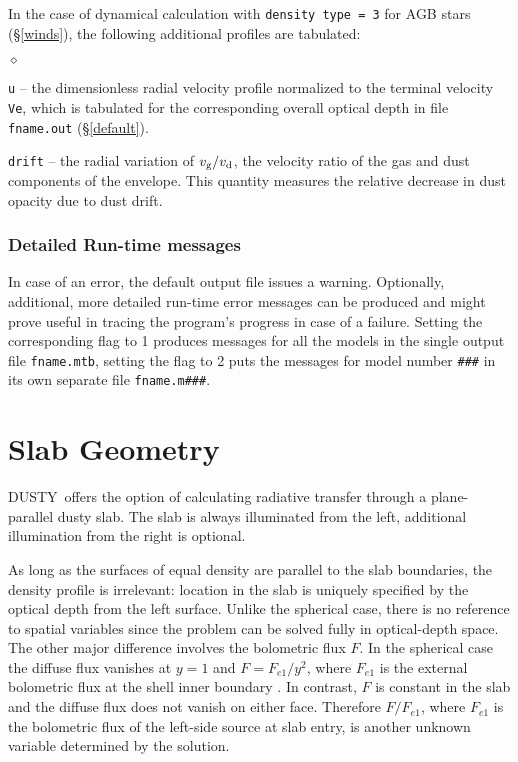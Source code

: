 \documentclass[12pt]{article} \usepackage{epsf}
\def\Section#1{\section{\sc #1}}
\def\D  {{\sf DUSTY}}
\begin{document}
In the case of dynamical calculation with {\tt density type = 3} for AGB stars
(\S\ref{winds}), the following additional profiles are tabulated:

\begin{list}{$\diamond$}{}
\item
{\tt u} -- the dimensionless radial velocity profile normalized to the terminal
velocity {\tt Ve}, which is tabulated for the corresponding overall optical
depth in file {\tt fname.out} (\S \ref{default}).
\item
{\tt drift} -- the radial variation of $v_{\rm g}/v_{\rm d}$, the velocity
ratio of the gas and dust components of the envelope.  This quantity measures
the relative decrease in dust opacity due to dust drift.

\end{list}

\subsubsection{Detailed Run-time messages}
\label{fname.m}

In case of an error, the default output file issues a warning. Optionally,
additional, more detailed run-time error messages can be produced and might
prove useful in tracing the program's progress in case of a failure. Setting
the corresponding flag to 1 produces messages for all the models in the single
output file {\tt fname.mtb}, setting the flag to 2 puts the messages for model
number {\tt \#\#\#} in its own separate file {\tt fname.m\#\#\#}.

\Section{Slab Geometry}
\label{slab}

\D\ offers the option of calculating radiative transfer through a
plane-parallel dusty slab. The slab is always illuminated from the left,
additional illumination from the right is optional.

As long as the surfaces of equal density are parallel to the slab boundaries,
the density profile is irrelevant: location in the slab is uniquely specified
by the optical depth from the left surface.  Unlike the spherical case, there
is no reference to spatial variables since the problem can be solved fully in
optical-depth space.  The other major difference involves the bolometric flux
$F$. In the spherical case the diffuse flux vanishes at $y = 1$ and $F =
F_{e1}/y^2$, where $F_{e1}$ is the external bolometric flux at the shell inner
boundary \cite{IE97}. In contrast, $F$ is constant in the slab and the diffuse
flux does not vanish on either face.  Therefore $F/F_{e1}$, where $F_{e1}$ is
the bolometric flux of the left-side source at slab entry, is another unknown
variable determined by the solution.
\end{document}
